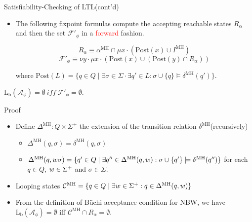 \documentclass[12pt]{beamer}
\begin{document}
\begin{frame}{Satisfiability-Checking of LTL(cont'd)}
	\begin{itemize}
		\item The following fixpoint formulas compute the accepting reachable states $R_{\alpha}$ and then the set $\mathcal{F}'_{\phi}$ in a \textcolor{red}{forward} fashion.

		$$R_{\alpha} \equiv \alpha^{\text{MH}} \cap \mu x \cdot (\text{Post}(x) \cup I^{\text{MH}})$$
		$$\mathcal{F}'_{\phi} \equiv \nu y \cdot \mu x \cdot (\text{Post}(x) \cup (\text{Post}(y) \cap R_{\alpha})) $$
		
		where $\text{Post}(L) = \{q \in Q \mid \exists \sigma \in \Sigma \cdot \exists q' \in L : \sigma \cup \{q\} \models \delta^{\text{MH}}(q')\}$.
	\end{itemize}
	\begin{theorem}
		$\text{L}_{\text{b}}(\mathcal{A}_{\phi}) = \emptyset ~ iff ~ \mathcal{F}'_{\phi} = \emptyset$.
	\end{theorem}
\end{frame}

\begin{frame}{Proof}
	\begin{itemize}
		\item Define $\Delta^{\text{MH}} : Q \times \Sigma^{+}$ the extension of the transition relation $\delta^{\text{MH}}$(recursively)
		\begin{itemize}
			\item $\Delta^{\text{MH}}(q, \sigma) = \delta^{\text{MH}}(q, \sigma)$
			\item $\Delta^{\text{MH}}(q, \mathnormal{w}\sigma) = \{q' \in Q \mid \exists q'' \in \Delta^{\text{MH}}(q, \mathnormal{w}) : \sigma \cup \{q'\} \models \delta^{\text{MH}}(q'')\}$ for each $q \in Q$, $\mathnormal{w} \in \Sigma^{+}$ and $\sigma \in \Sigma$.
		\end{itemize}
		\item Looping states $\mathcal{C}^{\text{MH}} = \{q \in Q \mid \exists \mathnormal{w} \in \Sigma^{+} : q \in \Delta^{\text{MH}}(q,\mathnormal{w})\}$
		\item From the definition of Büchi acceptance condition for NBW, we have $\text{L}_{\text{b}}(\mathcal{A}_{\phi}) = \emptyset$ iff $\mathcal{C}^{\text{MH}} \cap R_{\alpha} = \emptyset$.
	\end{itemize}
\end{frame}
\end{document}
